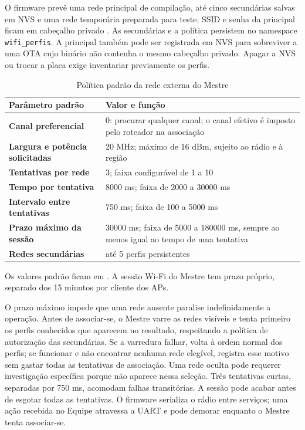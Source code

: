 O firmware prevê uma rede principal de compilação, até cinco secundárias salvas em NVS e uma rede temporária preparada para teste. SSID e senha da principal ficam em cabeçalho privado . As secundárias e a política persistem no namespace \texttt{wifi\_perfis}. A principal também pode ser registrada em NVS para sobreviver a uma OTA cujo binário não contenha o mesmo cabeçalho privado. Apagar a NVS ou trocar a placa exige inventariar previamente os perfis.

\begin{table}[htbp]\centering\small
\begin{tabularx}{\textwidth}{>{\bfseries}p{5.5cm}X}
\toprule
Parâmetro padrão & Valor e função\\
\midrule
Canal preferencial & 0: procurar qualquer canal; o canal efetivo é imposto pelo roteador na associação\\
Largura e potência solicitadas & 20 MHz; máximo de 16 dBm, sujeito ao rádio e à região\\
Tentativas por rede & 3; faixa configurável de 1 a 10\\
Tempo por tentativa & 8000 ms; faixa de 2000 a 30000 ms\\
Intervalo entre tentativas & 750 ms; faixa de 100 a 5000 ms\\
Prazo máximo da sessão & 30000 ms; faixa de 5000 a 180000 ms, sempre ao menos igual ao tempo de uma tentativa\\
Redes secundárias & até 5 perfis persistentes\\
\bottomrule
\end{tabularx}
\caption{Política padrão da rede externa do Mestre}\label{tab:wifi-mestre}
\end{table}

Os valores padrão ficam em . A sessão Wi-Fi do Mestre tem prazo próprio, separado dos 15 minutos por cliente dos APs.

O prazo máximo impede que uma rede ausente paralise indefinidamente a operação. Antes de associar-se, o Mestre varre as redes visíveis e tenta primeiro os perfis conhecidos que aparecem no resultado, respeitando a política de autorização das secundárias. Se a varredura falhar, volta à ordem normal dos perfis; se funcionar e não encontrar nenhuma rede elegível, registra esse motivo sem gastar todas as tentativas de associação. Uma rede oculta pode requerer investigação específica porque não aparece nessa seleção. Três tentativas curtas, separadas por 750 ms, acomodam falhas transitórias. A sessão pode acabar antes de esgotar todas as tentativas. O firmware serializa o rádio entre serviços; uma ação recebida no Equipe atravessa a UART e pode demorar enquanto o Mestre tenta associar-se.

